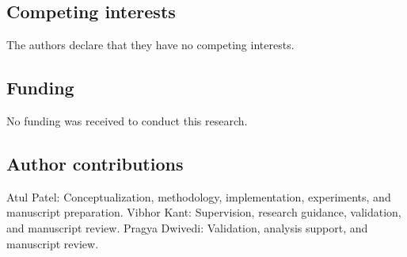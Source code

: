 \documentclass[pdflatex,sn-mathphys-num]{sn-jnl}%
\theoremstyle{thmstyleone}%
\theoremstyle{thmstyletwo}%
\theoremstyle{thmstylethree}%
\begin{document}
\subsection*{Competing interests}
The authors declare that they have no competing interests.

\subsection*{Funding}
No funding was received to conduct this research.

\subsection*{Author contributions}
Atul Patel: Conceptualization, methodology, implementation, experiments, and manuscript preparation.
Vibhor Kant: Supervision, research guidance, validation, and manuscript review.
Pragya Dwivedi: Validation, analysis support, and manuscript review.

\end{document}
